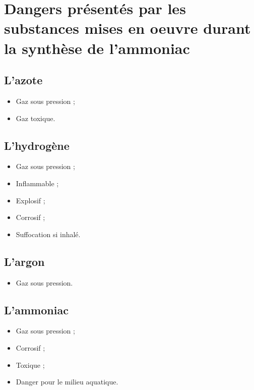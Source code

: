 

\section{Dangers présentés par les substances mises en oeuvre durant la synthèse de l'ammoniac}

\subsection{L'azote}
\begin{itemize}
  \item Gaz sous pression ;
  \item Gaz toxique.
\end{itemize}

\subsection{L'hydrogène}
\begin{itemize}
  \item Gaz sous pression ;
  \item Inflammable ;
  \item Explosif ;
  \item Corrosif ;
  \item Suffocation si inhalé.
\end{itemize}

\subsection{L'argon}
\begin{itemize}
  \item Gaz sous pression.
\end{itemize}

\subsection{L'ammoniac}
\begin{itemize}
  \item Gaz sous pression ;
  \item Corrosif ;
  \item Toxique ;
  \item Danger pour le milieu aquatique.
\end{itemize}


